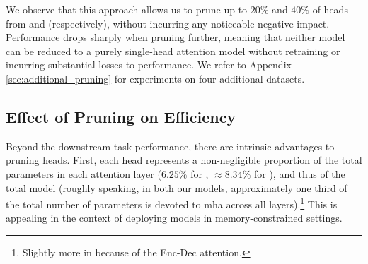 
We observe that this approach allows us to prune up to $20\%$ and $40\%$ of heads from \tfwmt{} and \bertmnli{} (respectively), without incurring any noticeable negative impact. Performance drops sharply when pruning further, meaning that neither model can be reduced to a purely single-head attention model without retraining or incurring substantial losses to performance. We refer to Appendix \ref{sec:additional_pruning} for experiments on four additional datasets.


\subsection{Effect of Pruning on Efficiency}

Beyond the downstream task performance, there are intrinsic advantages to pruning heads. First, each head represents a non-negligible proportion of the total parameters in each attention layer ($6.25\%$ for \tfwmt{}, $\approx 8.34\%$ for \bertmnli{}), and thus of the total model (roughly speaking, in both our models, approximately one third of the total number of parameters is devoted to \ac{mha} across all layers).\footnote{Slightly more in \tfwmt{} because of the Enc-Dec attention.} This is appealing in the context of deploying models in memory-constrained settings.



